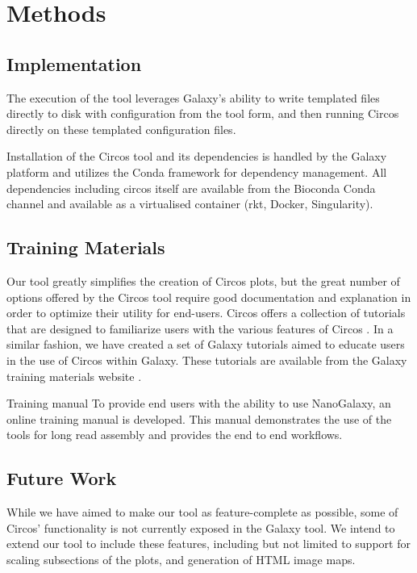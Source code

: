 \documentclass[a4paper,num-refs]{oup-contemporary}
\begin{document}
\section{Methods}
\subsection{Implementation}
The execution of the tool leverages Galaxy's ability to write templated files directly to disk with configuration from the tool form, and then running Circos directly on these templated configuration files.

Installation of the Circos tool and its dependencies is handled by the Galaxy platform and utilizes the Conda framework for dependency management. All dependencies including circos itself are available from the Bioconda Conda channel \cite{gruning2018bioconda} and available as a virtualised container (rkt, Docker, Singularity).



\subsection{Training Materials}
Our tool greatly simplifies the creation of Circos plots, but the great number of options offered by the Circos tool require good documentation and explanation in order to optimize their utility for end-users. Circos offers a collection of tutorials that are designed to familiarize users with the various features of Circos \cite{circostutorials}. In a similar fashion, we have created a set of Galaxy tutorials aimed to educate users in the use of Circos within Galaxy. These tutorials are available from the Galaxy training materials website \cite{Batut2018}.

Training manual
To provide end users with the ability to use NanoGalaxy, an online training manual is developed. This manual demonstrates the use of the tools for long read assembly and provides the end to end workflows.

\subsection{Future Work}
While we have aimed to make our tool as feature-complete as possible, some of Circos' functionality is not currently exposed in the Galaxy tool. We intend to extend our tool to include these features, including but not limited to support for scaling subsections of the plots, and generation of HTML image maps.
\end{document}
